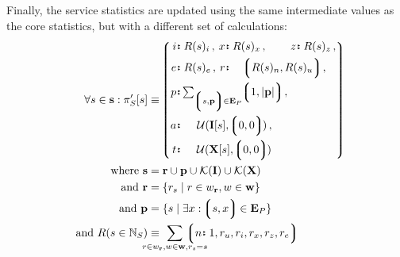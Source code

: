 Finally, the service statistics are updated using the same intermediate values as the core statistics, but with a different set of calculations:
\begin{align}
  \forall s \in \mathbf{s} : \pi'_S[s] &\equiv \tup{
    \begin{alignedat}{5}
      \is{i&}{R(s)_i}\,,\;
      \is{&x&}{R(s)_x}\,,\;
      \is{&z&}{R(s)_z}\,,\\
      \is{e&}{R(s)_e}\,,\;
      \is{&r&}{\span\span\tup{R(s)_n, R(s)_u}}\,,\;\\
      \is{p&}{\span\span \textstyle \sum_{\tup{s, \mathbf{p}} \in \mathbf{E}_P} \tup{1, \len{\mathbf{p}}}}\,,\;\\
      \is{a&}{\span\span \subifnone(\mathbf{I}[s], \tup{0, 0})}\,,\; \ \ \\
      \is{t&}{\span\span \subifnone(\mathbf{X}[s], \tup{0, 0})} \quad\\
    \end{alignedat}
  }\!\!\!\!\\
  \where \mathbf{s} &= \mathbf{r} \cup \mathbf{p} \cup \keys{\mathbf{I}} \cup \keys{\mathbf{X}}\\
  \also \mathbf{r} &= \{r_s \mid r \in w_\mathbf{r}, w \in \mathbf{w} \}\\
  \also \mathbf{p} &= \{s \mid \exists x: \tup{s, x} \in \mathbf{E}_P \}\\
  \also R(s \in \N_S) &\equiv \!\!\!\!\!\!\!\!\!\!\!
    \sum_{r \in w_\mathbf{r}, w \in \mathbf{w}, r_s = s}\!\!\!\!\!\!\!\!\!\!\!
    \tup{\is{n}{1}, r_u, r_i, r_x, r_z, r_e}
\end{align}
